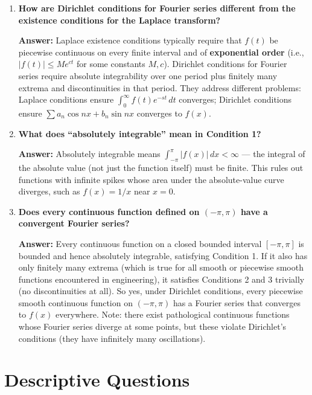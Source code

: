 \documentclass[12pt,a4paper]{article}
\begin{document}
\begin{enumerate}[label=\textbf{Q\arabic*.}]
\item \textbf{How are Dirichlet conditions for Fourier series different from the existence conditions for the Laplace transform?}

   \textbf{Answer:} Laplace existence conditions typically require that $f(t)$ be piecewise continuous on every finite interval and of \textbf{exponential order} (i.e., $|f(t)| \leq Me^{ct}$ for some constants $M,c$). Dirichlet conditions for Fourier series require absolute integrability over one period plus finitely many extrema and discontinuities in that period. They address different problems: Laplace conditions ensure $\int_0^{\infty}f(t)e^{-st}\,dt$ converges; Dirichlet conditions ensure $\sum a_n\cos nx + b_n\sin nx$ converges to $f(x)$.

\item \textbf{What does ``absolutely integrable'' mean in Condition 1?}

   \textbf{Answer:} Absolutely integrable means $\int_{-\pi}^{\pi}|f(x)|\,dx < \infty$ --- the integral of the absolute value (not just the function itself) must be finite. This rules out functions with infinite spikes whose area under the absolute-value curve diverges, such as $f(x)=1/x$ near $x=0$.

\item \textbf{Does every continuous function defined on $(-\pi,\pi)$ have a convergent Fourier series?}

   \textbf{Answer:} Every continuous function on a closed bounded interval $[-\pi,\pi]$ is bounded and hence absolutely integrable, satisfying Condition 1. If it also has only finitely many extrema (which is true for all smooth or piecewise smooth functions encountered in engineering), it satisfies Conditions 2 and 3 trivially (no discontinuities at all). So yes, under Dirichlet conditions, every piecewise smooth continuous function on $(-\pi,\pi)$ has a Fourier series that converges to $f(x)$ everywhere. Note: there exist pathological continuous functions whose Fourier series diverge at some points, but these violate Dirichlet's conditions (they have infinitely many oscillations).

\end{enumerate}

\section{Descriptive Questions}
\end{document}
